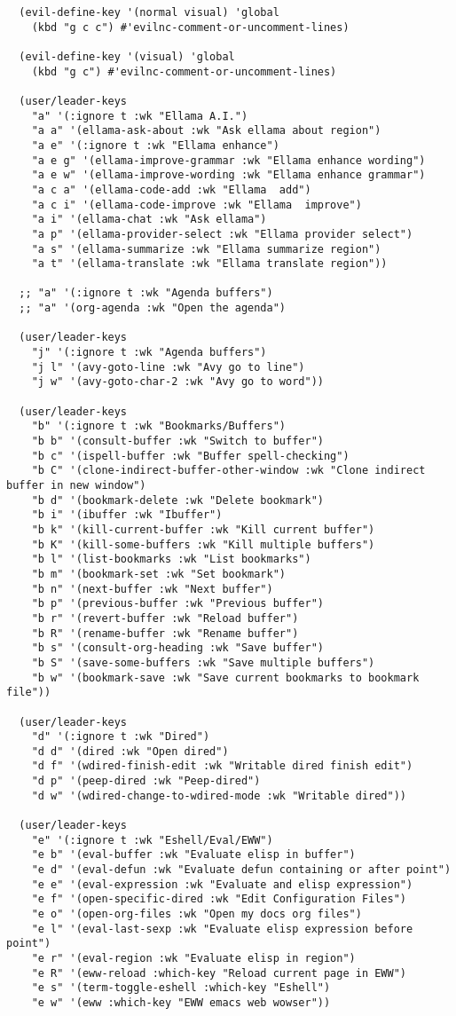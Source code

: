 \documentclass[11pt]{article}
\begin{document}
\begin{verbatim}
  (evil-define-key '(normal visual) 'global
    (kbd "g c c") #'evilnc-comment-or-uncomment-lines)

  (evil-define-key '(visual) 'global
    (kbd "g c") #'evilnc-comment-or-uncomment-lines)

  (user/leader-keys
    "a" '(:ignore t :wk "Ellama A.I.")
    "a a" '(ellama-ask-about :wk "Ask ellama about region")
    "a e" '(:ignore t :wk "Ellama enhance")
    "a e g" '(ellama-improve-grammar :wk "Ellama enhance wording")
    "a e w" '(ellama-improve-wording :wk "Ellama enhance grammar")
    "a c a" '(ellama-code-add :wk "Ellama  add")
    "a c i" '(ellama-code-improve :wk "Ellama  improve")
    "a i" '(ellama-chat :wk "Ask ellama")
    "a p" '(ellama-provider-select :wk "Ellama provider select")
    "a s" '(ellama-summarize :wk "Ellama summarize region")
    "a t" '(ellama-translate :wk "Ellama translate region"))

  ;; "a" '(:ignore t :wk "Agenda buffers")
  ;; "a" '(org-agenda :wk "Open the agenda")

  (user/leader-keys
    "j" '(:ignore t :wk "Agenda buffers")
    "j l" '(avy-goto-line :wk "Avy go to line")
    "j w" '(avy-goto-char-2 :wk "Avy go to word"))

  (user/leader-keys
    "b" '(:ignore t :wk "Bookmarks/Buffers")
    "b b" '(consult-buffer :wk "Switch to buffer")
    "b c" '(ispell-buffer :wk "Buffer spell-checking")
    "b C" '(clone-indirect-buffer-other-window :wk "Clone indirect buffer in new window")
    "b d" '(bookmark-delete :wk "Delete bookmark")
    "b i" '(ibuffer :wk "Ibuffer")
    "b k" '(kill-current-buffer :wk "Kill current buffer")
    "b K" '(kill-some-buffers :wk "Kill multiple buffers")
    "b l" '(list-bookmarks :wk "List bookmarks")
    "b m" '(bookmark-set :wk "Set bookmark")
    "b n" '(next-buffer :wk "Next buffer")
    "b p" '(previous-buffer :wk "Previous buffer")
    "b r" '(revert-buffer :wk "Reload buffer")
    "b R" '(rename-buffer :wk "Rename buffer")
    "b s" '(consult-org-heading :wk "Save buffer")
    "b S" '(save-some-buffers :wk "Save multiple buffers")
    "b w" '(bookmark-save :wk "Save current bookmarks to bookmark file"))

  (user/leader-keys
    "d" '(:ignore t :wk "Dired")
    "d d" '(dired :wk "Open dired")
    "d f" '(wdired-finish-edit :wk "Writable dired finish edit")
    "d p" '(peep-dired :wk "Peep-dired")
    "d w" '(wdired-change-to-wdired-mode :wk "Writable dired"))

  (user/leader-keys
    "e" '(:ignore t :wk "Eshell/Eval/EWW")    
    "e b" '(eval-buffer :wk "Evaluate elisp in buffer")
    "e d" '(eval-defun :wk "Evaluate defun containing or after point")
    "e e" '(eval-expression :wk "Evaluate and elisp expression")
    "e f" '(open-specific-dired :wk "Edit Configuration Files")
    "e o" '(open-org-files :wk "Open my docs org files")
    "e l" '(eval-last-sexp :wk "Evaluate elisp expression before point")
    "e r" '(eval-region :wk "Evaluate elisp in region")
    "e R" '(eww-reload :which-key "Reload current page in EWW")
    "e s" '(term-toggle-eshell :which-key "Eshell")
    "e w" '(eww :which-key "EWW emacs web wowser"))


\end{verbatim}
\end{document}
